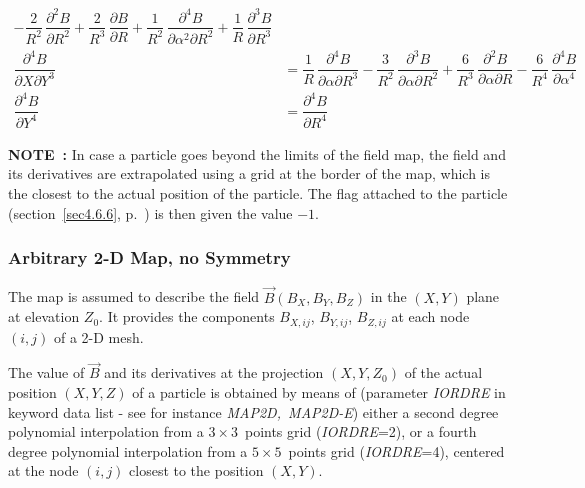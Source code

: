 {\begin{equation}
\begin{array}{ll}
	           - \dfrac{2 }{ R^2} \, \dfrac{\partial^2 B }{ \partial R^2} 
	           + \dfrac{2 }{ R^3} \, \dfrac{\partial B }{ \partial R} 
	           + \dfrac{1 }{ R^2} \, \dfrac{\partial^4 B }{ \partial \alpha^2\partial R^2} 
	           + \dfrac{1 }{ R} \, \dfrac{\partial^3 B }{ \partial R^3}\\     %
	     \dfrac{ \partial^4 B }{ \partial X\partial Y^3} 
	         & = \dfrac{ 1 }{ R} \, \dfrac{\partial^4 B }{\partial \alpha \partial R^3} 
	           - \dfrac{3 }{ R^2} \, \dfrac{\partial^3 B }{ \partial \alpha \partial R^2} 
	           + \dfrac{6 }{ R^3} \, \dfrac{\partial^2 B }{ \partial \alpha\partial R} 
	           - \dfrac{6 }{ R^4} \, \dfrac{\partial^4 B }{ \partial \alpha^ 4} \\  %
	     \dfrac{ \partial^4 B }{ \partial Y^4}
	         & =   \dfrac{ \partial^4 B }{ \partial R^4}
	 \end{array} 
	\label{eq2-4-9}
\end{equation}  }
 
\medskip 


\noindent \textbf{NOTE~:} In case  a particle goes beyond the limits of the 
 field map, the field and its derivatives are extrapolated 
using  a grid at the border of the map,  which is the closest to the actual position of the 
particle.         
The flag \IEX{} attached to the particle (section~\ref{sec4.6.6}, p.~\pageref{sec4.6.6}) 
is then given the value $-1$. 




\subsubsection{Arbitrary 2-D Map, no Symmetry} \label{sec2.4.3}

The map is assumed to describe the field $ \vec  B(B_X,B_Y,B_Z) $ in the $ (X,Y) $ 
plane at elevation $ Z_0 $. It provides the components $ B_{X,ij}$, $
B_{Y,ij}$,  $ B_{Z,ij} $ at 
each node $ (i,j) $ of a 2-D mesh. 

\noindent The value of $ \vec  B $ and its derivatives at the projection $
(X,Y,Z_0) $ of the actual position $ (X,Y,Z) $ 
of a particle is obtained by means of  
 (parameter \textsl{IORDRE} in  keyword data list - see for instance \textsl{MAP2D,~MAP2D-E})
either a second degree polynomial interpolation from a $3 \times 3$~points grid (\textsl{IORDRE}=2),  
or a fourth degree polynomial interpolation from a $5 \times 5$~points grid (\textsl{IORDRE}=4),  
centered at the node $(i,j) $  closest to the position $ (X,Y)$. 


